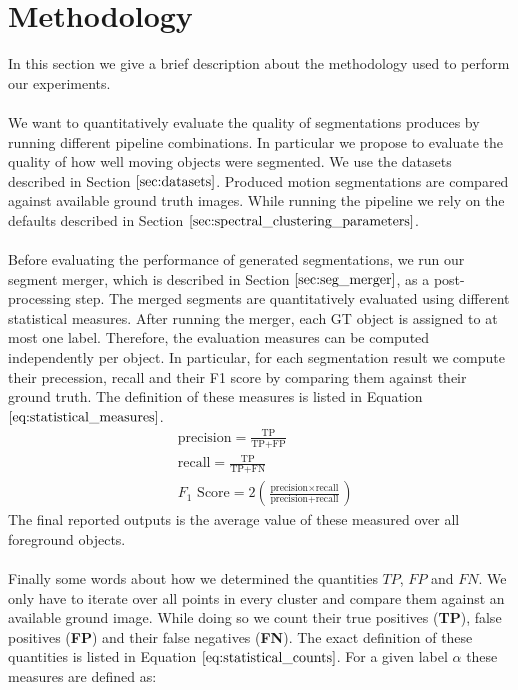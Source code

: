 \section{Methodology}
\label{sec:methodology}
In this section we give a brief description about the methodology used to perform our experiments. \\ \\
We want to quantitatively evaluate the quality of segmentations produces by running different pipeline combinations. In particular we propose to evaluate the quality of how well moving objects were segmented. We use the datasets described in Section $\ref{sec:datasets}$. Produced motion segmentations are compared against available ground truth images. While running the pipeline we rely on the defaults described in Section $\ref{sec:spectral_clustering_parameters}$.\\ \\
Before evaluating the performance of generated segmentations, we run our segment merger, which is described in Section $\ref{sec:seg_merger}$, as a post-processing step. The merged segments are quantitatively evaluated using different statistical measures. After running the merger, each GT object is assigned to at most one label. Therefore, the evaluation measures can be computed independently per object. In particular, for each segmentation result we compute their precession, recall and their F1 score by comparing them against their ground truth. The definition of these measures is listed in Equation $\ref{eq:statistical_measures}$. 
\begin{equation}
\begin{aligned}
	& \text{precision} = \frac{\text{TP}}{\text{TP} + \text{FP}} \\
	& \text{recall} = \frac{\text{TP}}{\text{TP} + \text{FN}} \\
	& F_1 \text{ Score} = 2 \left( \frac{\text{precision} \times \text{recall}}{\text{precision} +\text{recall}} \right)
\end{aligned}
\label{eq:statistical_measures}
\end{equation}
The final reported outputs is the average value of these measured over all foreground objects. \\ \\
Finally some words about how we determined the quantities $TP$, $FP$ and $FN$. We only have to iterate over all points in every cluster and compare them against an available ground image. While doing so we count their true positives (\textbf{TP}), false positives (\textbf{FP}) and their false negatives (\textbf{FN}). The exact definition of these quantities is listed in Equation $\ref{eq:statistical_counts}$. For a given label $\alpha$ these measures are defined as:
